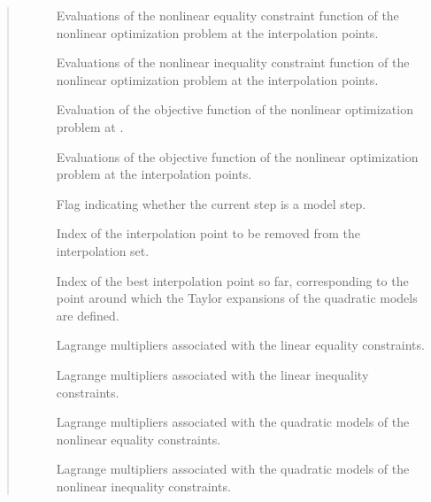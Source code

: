 \documentclass[letterpaper,10pt,english]{sphinxmanual}
\begin{document}
\begin{fulllineitems}
\begin{quote}
\begin{description}
\begin{description}
\item[{}] \leavevmode
\sphinxAtStartPar
Evaluations of the nonlinear equality constraint function of the nonlinear optimization problem at the interpolation points.

\item[{}] \leavevmode
\sphinxAtStartPar
Evaluations of the nonlinear inequality constraint function of the nonlinear optimization problem at the interpolation points.

\item[{}] \leavevmode
\sphinxAtStartPar
Evaluation of the objective function of the nonlinear optimization problem at .

\item[{}] \leavevmode
\sphinxAtStartPar
Evaluations of the objective function of the nonlinear optimization problem at the interpolation points.

\item[{}] \leavevmode
\sphinxAtStartPar
Flag indicating whether the current step is a model step.

\item[{}] \leavevmode
\sphinxAtStartPar
Index of the interpolation point to be removed from the interpolation set.

\item[{}] \leavevmode
\sphinxAtStartPar
Index of the best interpolation point so far, corresponding to the point around which the Taylor expansions of the quadratic models are defined.

\item[{}] \leavevmode
\sphinxAtStartPar
Lagrange multipliers associated with the linear equality constraints.

\item[{}] \leavevmode
\sphinxAtStartPar
Lagrange multipliers associated with the linear inequality constraints.

\item[{}] \leavevmode
\sphinxAtStartPar
Lagrange multipliers associated with the quadratic models of the nonlinear equality constraints.

\item[{}] \leavevmode
\sphinxAtStartPar
Lagrange multipliers associated with the quadratic models of the nonlinear inequality constraints.


\end{description}
\end{description}
\end{quote}
\end{fulllineitems}
\end{document}

